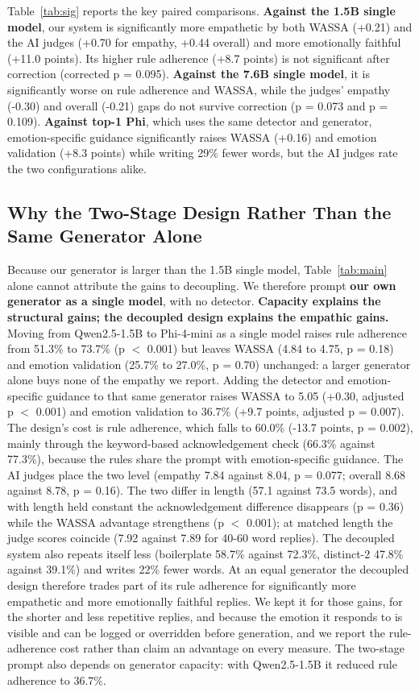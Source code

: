 \documentclass[conference,a4paper]{IEEEtran}
\begin{document}
Table~\ref{tab:sig} reports the key paired comparisons. \textbf{Against the 1.5B single model}, our system is significantly more empathetic by both WASSA (+0.21) and the AI judges (+0.70 for empathy, +0.44 overall) and more emotionally faithful (+11.0 points). Its higher rule adherence (+8.7 points) is not significant after correction (corrected p = 0.095). \textbf{Against the 7.6B single model}, it is significantly worse on rule adherence and WASSA, while the judges' empathy (-0.30) and overall (-0.21) gaps do not survive correction (p = 0.073 and p = 0.109). \textbf{Against top-1 Phi}, which uses the same detector and generator, emotion-specific guidance significantly raises WASSA (+0.16) and emotion validation (+8.3 points) while writing 29\% fewer words, but the AI judges rate the two configurations alike.


\subsection{Why the Two-Stage Design Rather Than the Same Generator Alone}
Because our generator is larger than the 1.5B single model, Table~\ref{tab:main} alone cannot attribute the gains to decoupling. We therefore prompt \textbf{our own generator as a single model}, with no detector. \textbf{Capacity explains the structural gains; the decoupled design explains the empathic gains.} Moving from Qwen2.5-1.5B to Phi-4-mini as a single model raises rule adherence from 51.3\% to 73.7\% (p $<$ 0.001) but leaves WASSA (4.84 to 4.75, p = 0.18) and emotion validation (25.7\% to 27.0\%, p = 0.70) unchanged: a larger generator alone buys none of the empathy we report. Adding the detector and emotion-specific guidance to that same generator raises WASSA to 5.05 (+0.30, adjusted p $<$ 0.001) and emotion validation to 36.7\% (+9.7 points, adjusted p = 0.007). The design's cost is rule adherence, which falls to 60.0\% (-13.7 points, p = 0.002), mainly through the keyword-based acknowledgement check (66.3\% against 77.3\%), because the rules share the prompt with emotion-specific guidance. The AI judges place the two level (empathy 7.84 against 8.04, p = 0.077; overall 8.68 against 8.78, p = 0.16). The two differ in length (57.1 against 73.5 words), and with length held constant the acknowledgement difference disappears (p = 0.36) while the WASSA advantage strengthens (p $<$ 0.001); at matched length the judge scores coincide (7.92 against 7.89 for 40-60 word replies). The decoupled system also repeats itself less (boilerplate 58.7\% against 72.3\%, distinct-2 47.8\% against 39.1\%) and writes 22\% fewer words. At an equal generator the decoupled design therefore trades part of its rule adherence for significantly more empathetic and more emotionally faithful replies. We kept it for those gains, for the shorter and less repetitive replies, and because the emotion it responds to is visible and can be logged or overridden before generation, and we report the rule-adherence cost rather than claim an advantage on every measure. The two-stage prompt also depends on generator capacity: with Qwen2.5-1.5B it reduced rule adherence to 36.7\%.
\end{document}
